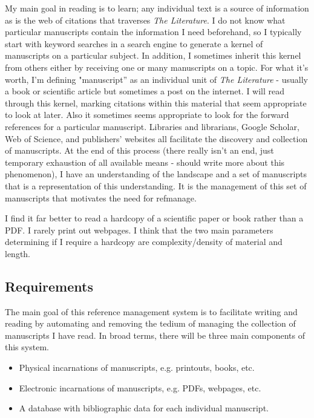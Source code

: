 \documentclass[letterpaper,12pt]{article}
\begin{document}
My main goal in reading is to learn; any individual text is a source of information as is the web of citations that traverses \emph{The Literature}. I do not know what particular manuscripts contain the information I need beforehand, so I typically start with keyword searches in a search engine to generate a kernel of manuscripts on a particular subject. In addition, I sometimes inherit this kernel from others either by receiving one or many manuscripts on a topic. For what it's worth, I'm defining "manuscript'' as an individual unit of \emph{The Literature}  - usually a book or scientific article but sometimes a post on the internet. I will read through this kernel, marking citations within this material that seem appropriate to look at later. Also it sometimes seems appropriate to look for the forward references for a particular manuscript. Libraries and librarians, Google Scholar, Web of Science, and publishers' websites all facilitate the discovery and collection of manuscripts. At the end of this process (there really isn't an end, just temporary exhaustion of all available means - should write more about this phenomenon), I have an understanding of the landscape and a set of manuscripts that is a representation of this understanding. It is the management of this set of manuscripts that motivates the need for refmanage.

I find it far better to read a hardcopy of a scientific paper or book rather than a PDF. I rarely print out webpages. I think that the two main parameters determining if I require a hardcopy are complexity/density of material and length.








\subsection{Requirements}
The main goal of this reference management system is to facilitate writing and reading by automating and removing the tedium of managing the collection of manuscripts I have read. In broad terms, there will be three main components of this system.

\begin{itemize}
\item Physical incarnations of manuscripts, e.g. printouts, books, etc.
\item Electronic incarnations of manuscripts, e.g. PDFs, webpages, etc.
\item A database with bibliographic data for each individual manuscript.
\end{itemize}
\end{document}
